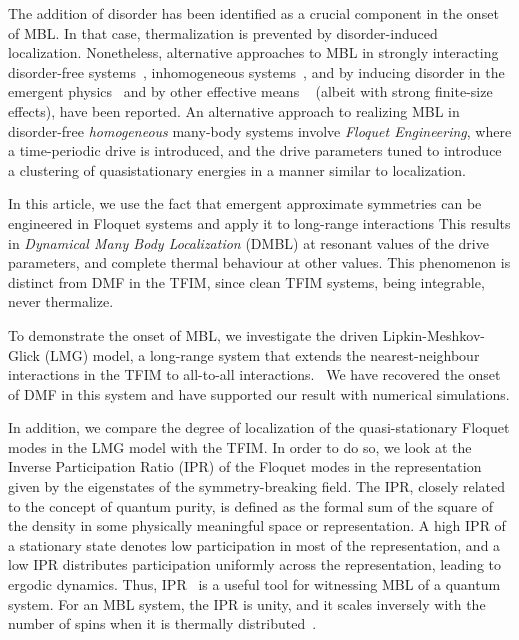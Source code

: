 \documentclass[%
reprint,
superscriptaddress,
linenumbers,
amsmath,amssymb,
aps,
prb,
showkeys,
]{revtex4-2}
\begin{document}
	The addition of disorder has been identified as a crucial component in the onset of MBL. In that case, thermalization is prevented by disorder-induced localization. Nonetheless, alternative approaches to MBL in strongly interacting disorder-free systems~\cite{diptiman2014, Carleo2012,aditya2023dynamical}, inhomogeneous systems~\cite{alessandro_markus, Grover2014,miles2015,Smith2017}, and by inducing disorder in the emergent physics~\cite{MBL_emergent_disorder} and by other effective means ~\cite{miles2015} (albeit with strong finite-size effects), have been reported. An alternative approach to realizing MBL in disorder-free \emph{homogeneous} many-body systems involve \textit{Floquet Engineering}, where a time-periodic drive is introduced, and the drive parameters tuned to introduce a clustering of quasistationary energies in a manner similar to localization\cite{zhang_floquet_2016}.

	
	In this article, {we use the fact that emergent approximate symmetries can be engineered in Floquet systems and apply it to long-range interactions This results in \textit{Dynamical Many Body Localization} (DMBL) at resonant values of the drive parameters}, and complete thermal behaviour at other values. This phenomenon is distinct from DMF in the TFIM, since clean TFIM systems, being integrable, never thermalize.
	
	
	To demonstrate the onset of MBL, we investigate the driven Lipkin-Meshkov-Glick (LMG) model\cite{lmg1965_1,lmg1965_2, lmg1965_3, ribeiro2008, debergh_2001,titum2020}, a long-range system {that extends the nearest-neighbour interactions in the TFIM to  all-to-all interactions.}~\cite{campa_statistical_2009, eisele_multiple_1988, canning_class_1992} We have recovered the onset of DMF in this system and have supported our result with numerical simulations.
	
	In addition, we compare the degree of localization of the quasi-stationary Floquet modes {in the LMG model with the TFIM}. In order to do so, we look at the Inverse Participation Ratio (IPR) of the Floquet modes in the representation given by the eigenstates of the symmetry-breaking field. The IPR, closely related to the concept of quantum purity, is defined as the formal sum of the square of the density in some physically meaningful space or representation. A high IPR of a stationary state denotes low participation in most of the representation, and a low IPR distributes participation uniformly across the representation, leading to ergodic dynamics\cite{vu_fermionic_2022}. Thus, IPR~\cite{Misguich2016} is a useful tool for witnessing MBL of a quantum system. For an MBL system, the IPR is unity, and it scales inversely with the {number of spins} when it is thermally distributed~\cite{calixto_inverse_2015}.
	
\end{document}
